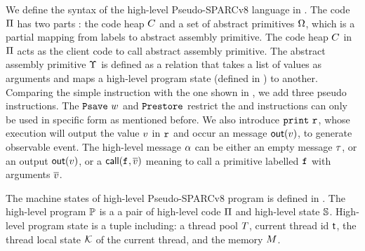 We define the syntax of the high-level Pseudo-SPARCv8 language 
in \Fig{\ref{fig:syntax-of-concur-pseudo-sparc}}. 
The code $\Pi$ has two parts : 
the code heap $C$ 
and a set of abstract primitives $\Omega$, 
which is a partial mapping from labels to 
abstract assembly primitive. The code heap $C$ in $\Pi$ 
acts as the client code to 
call abstract assembly primitive. 
The abstract assembly primitive $\Upsilon$ 
is defined as a relation that takes a list of values 
as arguments and maps a high-level program state 
(defined in \Fig{\ref{fig:machine-state-concur-pseudo-sparc}}) 
to another. 
Comparing the simple instruction with the one shown in 
\Fig{\ref{fig:Machine States and Language for SPARC Code}}, 
we add three pseudo instructions. The $\texttt{Psave} \ w$ 
and $\texttt{Prestore}$ restrict the \csave{} and \crestore{}
instructions can only be used in specific form as 
mentioned before.  
We also introduce $\texttt{print} \ \texttt{r}_{}$, 
whose execution will output the value $v$ in $\texttt{r}_{}$ and 
occur an message $\textsf{out}({v})$, 
to generate observable event. 
The high-level message 
$\alpha$ can be either an empty message $\tau$, or an output 
$\textsf{out}({v})$, or a $\textsf{call}({\texttt{f}_{}, \overline{v}})$ meaning to 
call a primitive labelled $\texttt{f}_{}$ with arguments $\overline{v}$. 

The machine states of high-level Pseudo-SPARCv8 program 
is defined in \Fig{\ref{fig:machine-state-concur-pseudo-sparc}}. 
The high-level program $\mathbb{P}$ is a a pair of high-level code 
$\Pi$ and high-level state $\mathbb{S}$. High-level program 
state is a tuple including: a thread pool $T$, 
current thread id $\textsf{t}$, the thread local state 
$\mathcal{K}$ of the current thread, and the memory $M$.

